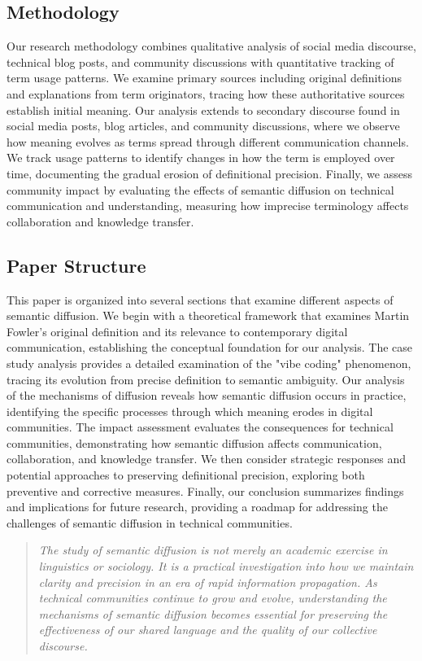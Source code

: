 \documentclass[11pt]{article}
\begin{document}
\subsection{Methodology}

Our research methodology combines qualitative analysis of social media discourse, technical blog posts, and community discussions with quantitative tracking of term usage patterns. We examine primary sources including original definitions and explanations from term originators, tracing how these authoritative sources establish initial meaning. Our analysis extends to secondary discourse found in social media posts, blog articles, and community discussions, where we observe how meaning evolves as terms spread through different communication channels. We track usage patterns to identify changes in how the term is employed over time, documenting the gradual erosion of definitional precision. Finally, we assess community impact by evaluating the effects of semantic diffusion on technical communication and understanding, measuring how imprecise terminology affects collaboration and knowledge transfer.

\subsection{Paper Structure}

This paper is organized into several sections that examine different aspects of semantic diffusion. We begin with a theoretical framework that examines Martin Fowler's original definition and its relevance to contemporary digital communication, establishing the conceptual foundation for our analysis. The case study analysis provides a detailed examination of the "vibe coding" phenomenon, tracing its evolution from precise definition to semantic ambiguity. Our analysis of the mechanisms of diffusion reveals how semantic diffusion occurs in practice, identifying the specific processes through which meaning erodes in digital communities. The impact assessment evaluates the consequences for technical communities, demonstrating how semantic diffusion affects communication, collaboration, and knowledge transfer. We then consider strategic responses and potential approaches to preserving definitional precision, exploring both preventive and corrective measures. Finally, our conclusion summarizes findings and implications for future research, providing a roadmap for addressing the challenges of semantic diffusion in technical communities.

\begin{quote}
\emph{The study of semantic diffusion is not merely an academic exercise in linguistics or sociology. It is a practical investigation into how we maintain clarity and precision in an era of rapid information propagation. As technical communities continue to grow and evolve, understanding the mechanisms of semantic diffusion becomes essential for preserving the effectiveness of our shared language and the quality of our collective discourse.}
\end{quote}
\end{document}
